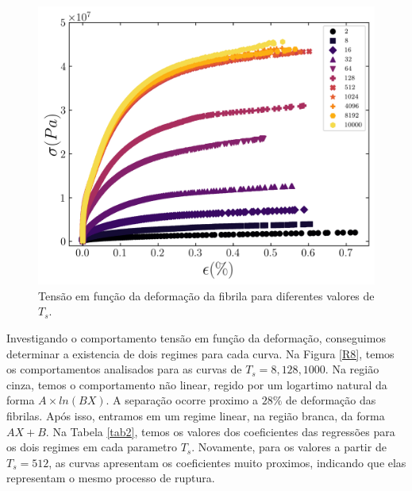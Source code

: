 \documentclass{article}
\begin{document}
    \begin{figure}[H]
        \centering
        \includegraphics[width=\textwidth]{figures/stress_strain.png}

        \caption{Tensão em função da deformação da fibrila para diferentes valores de \(T_{s}\).} 

        \label{R5}
    \end{figure}

    Investigando o comportamento tensão em função da deformação, conseguimos determinar a existencia de dois regimes 
    para cada curva. Na Figura \ref{R8}, temos os comportamentos analisados para as curvas de \(T_{s} = 8, 128, 1000\). 
    Na região cinza, temos o comportamento não linear, regido por um logartimo natural da forma \(A\times ln(BX)\).
    A separação ocorre proximo a \(28 \%\) de deformação das fibrilas. Após isso, entramos em um regime linear, na 
    região branca, da forma \(AX + B\). Na Tabela \ref{tab2}, temos os valores dos coeficientes das regressões para os
    dois regimes em cada parametro \(T_{s}\). Novamente, para os valores a partir de \(T_{s} = 512\), as curvas apresentam 
    os coeficientes muito proximos, indicando que elas representam o mesmo processo de ruptura.
\end{document}
